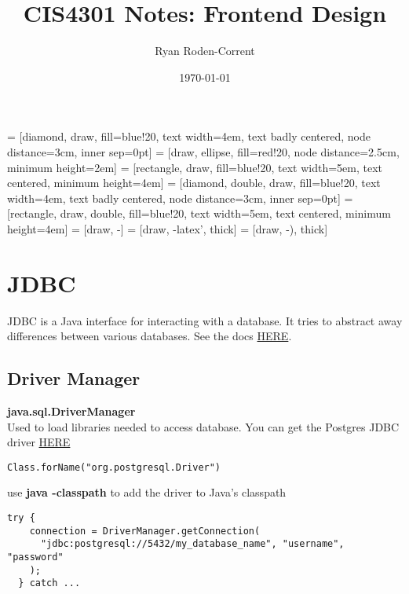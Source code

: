 \documentclass[12pt]{article}
\title{CIS4301 Notes: Frontend Design}
\author{Ryan Roden-Corrent}
\date{\today}
\begin{document}
\setlength\parindent{0pt}
 = [diamond, draw, fill=blue!20, text width=4em,
  text badly centered, node distance=3cm, inner sep=0pt]
 = [draw, ellipse, fill=red!20, node distance=2.5cm,
  minimum height=2em]
 = [rectangle, draw, fill=blue!20, text width=5em,
  text centered, minimum height=4em]
 = [diamond, double, draw, fill=blue!20, text width=4em,
  text badly centered, node distance=3cm, inner sep=0pt]
 = [rectangle, draw, double, fill=blue!20, text width=5em,
  text centered, minimum height=4em]
 = [draw, -]
 = [draw, -latex', thick]
 = [draw, -), thick]
\maketitle
\section{JDBC}
JDBC is a Java interface for interacting with a database. It tries to abstract
away differences between various databases.
See the docs \href{http://docs.oracle.com/javase/tutorial/jdbc/basics/}{HERE}.

\subsection{Driver Manager}
\textbf{java.sql.DriverManager}\\
Used to load libraries needed to access database. You can get the Postgres JDBC
driver \href{http://jdbc.postgresql.org/download.html}{HERE}
\begin{lstlisting}[caption=loading the Postgres driver]
  Class.forName("org.postgresql.Driver")
\end{lstlisting}
use \textbf{java -classpath} to add the driver to Java's classpath

\begin{lstlisting}[caption=connecting to a Postgres DB]
  try {
    connection = DriverManager.getConnection(
      "jdbc:postgresql://5432/my_database_name", "username", "password"
    );
  } catch ...
\end{lstlisting}
\end{document}
